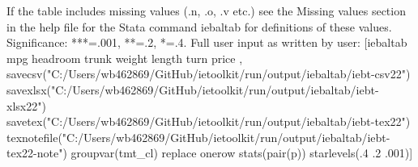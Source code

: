If the table includes missing values (.n, .o, .v etc.) see the Missing values section in the help file for the Stata command iebaltab for definitions of these values. Significance: ***=.001, **=.2, *=.4. Full user input as written by user: [iebaltab mpg headroom trunk weight length turn price , savecsv("C:/Users/wb462869/GitHub/ietoolkit/run/output/iebaltab/iebt-csv22") savexlsx("C:/Users/wb462869/GitHub/ietoolkit/run/output/iebaltab/iebt-xlsx22") savetex("C:/Users/wb462869/GitHub/ietoolkit/run/output/iebaltab/iebt-tex22") texnotefile("C:/Users/wb462869/GitHub/ietoolkit/run/output/iebaltab/iebt-tex22-note") groupvar(tmt\_cl) replace onerow stats(pair(p)) starlevels(.4 .2 .001)]
